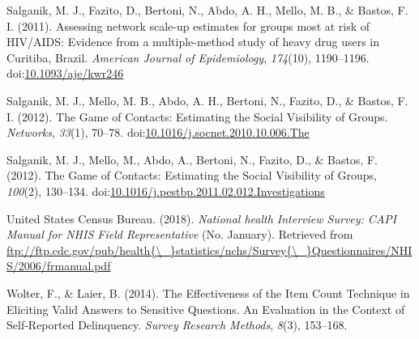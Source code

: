 \documentclass[man]{apa6}
\theoremstyle{definition}
\theoremstyle{definition}
\theoremstyle{definition}
\theoremstyle{remark}
\begin{document}
\hypertarget{ref-Salganik2011}{}
Salganik, M. J., Fazito, D., Bertoni, N., Abdo, A. H., Mello, M. B., \&
Bastos, F. I. (2011). Assessing network scale-up estimates for groups
most at risk of HIV/AIDS: Evidence from a multiple-method study of heavy
drug users in Curitiba, Brazil. \emph{American Journal of Epidemiology},
\emph{174}(10), 1190--1196.
doi:\href{https://doi.org/10.1093/aje/kwr246}{10.1093/aje/kwr246}

\hypertarget{ref-Salganik2012b}{}
Salganik, M. J., Mello, M. B., Abdo, A. H., Bertoni, N., Fazito, D., \&
Bastos, F. I. (2012). The Game of Contacts: Estimating the Social
Visibility of Groups. \emph{Networks}, \emph{33}(1), 70--78.
doi:\href{https://doi.org/10.1016/j.socnet.2010.10.006.The}{10.1016/j.socnet.2010.10.006.The}

\hypertarget{ref-Salganik2012}{}
Salganik, M. J., Mello, M., Abdo, A., Bertoni, N., Fazito, D., \&
Bastos, F. (2012). The Game of Contacts: Estimating the Social
Visibility of Groups, \emph{100}(2), 130--134.
doi:\href{https://doi.org/10.1016/j.pestbp.2011.02.012.Investigations}{10.1016/j.pestbp.2011.02.012.Investigations}

\hypertarget{ref-NHIS2006}{}
United States Census Bureau. (2018). \emph{National health Interview
Survey: CAPI Manual for NHIS Field Representative} (No. January).
Retrieved from
\href{ftp://ftp.cdc.gov/pub/health\%7B/_\%7Dstatistics/nchs/Survey\%7B/_\%7DQuestionnaires/NHIS/2006/frmanual.pdf}{ftp://ftp.cdc.gov/pub/health\{\textbackslash{}\_\}statistics/nchs/Survey\{\textbackslash{}\_\}Questionnaires/NHIS/2006/frmanual.pdf}

\hypertarget{ref-Wolter2014}{}
Wolter, F., \& Laier, B. (2014). The Effectiveness of the Item Count
Technique in Eliciting Valid Answers to Sensitive Questions. An
Evaluation in the Context of Self-Reported Delinquency. \emph{Survey
Research Methods}, \emph{8}(3), 153--168.

\endgroup
\end{document}
